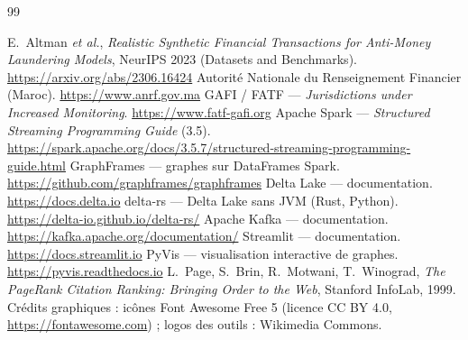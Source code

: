 \begin{thebibliography}{99}
\small
{} E.~Altman \emph{et al.}, \emph{Realistic Synthetic Financial Transactions for
Anti-Money Laundering Models}, NeurIPS 2023 (Datasets and Benchmarks).
\url{https://arxiv.org/abs/2306.16424}
 Autorité Nationale du Renseignement Financier (Maroc). \url{https://www.anrf.gov.ma}
 GAFI / FATF --- \emph{Jurisdictions under Increased Monitoring}.
\url{https://www.fatf-gafi.org}
 Apache Spark --- \emph{Structured Streaming Programming Guide} (3.5).
\url{https://spark.apache.org/docs/3.5.7/structured-streaming-programming-guide.html}
 GraphFrames --- graphes sur DataFrames Spark.
\url{https://github.com/graphframes/graphframes}
 Delta Lake --- documentation. \url{https://docs.delta.io}
 delta-rs --- Delta Lake sans JVM (Rust, Python).
\url{https://delta-io.github.io/delta-rs/}
 Apache Kafka --- documentation. \url{https://kafka.apache.org/documentation/}
 Streamlit --- documentation. \url{https://docs.streamlit.io}
 PyVis --- visualisation interactive de graphes. \url{https://pyvis.readthedocs.io}
 L.~Page, S.~Brin, R.~Motwani, T.~Winograd, \emph{The PageRank Citation Ranking:
Bringing Order to the Web}, Stanford InfoLab, 1999.
 Crédits graphiques : icônes Font Awesome Free 5 (licence CC BY 4.0,
\url{https://fontawesome.com}) ; logos des outils : Wikimedia Commons.
\end{thebibliography}
